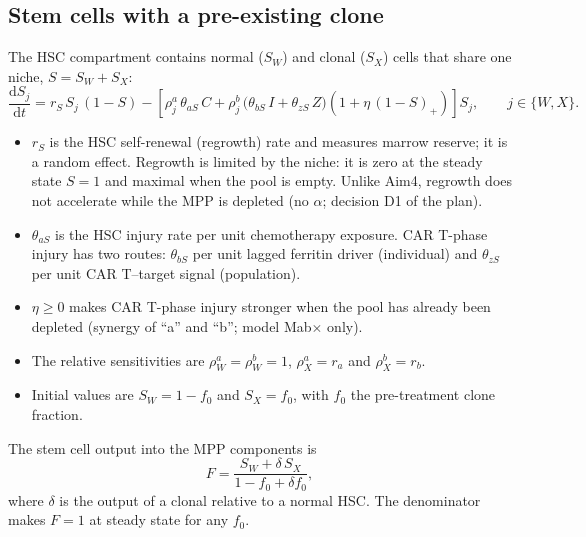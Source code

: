 \documentclass[11pt]{article}
\newcommand{\dd}{\mathrm{d}}
\newcommand{\pos}[1]{\left(#1\right)_{+}}
\begin{document}
\subsection{Stem cells with a pre-existing clone}
The HSC compartment contains normal ($S_W$) and clonal ($S_X$) cells that share one niche, $S=S_W+S_X$:
\begin{equation}
\frac{\dd S_j}{\dd t} = r_S\,S_j\,(1-S) - \left[\rho^a_j\,\theta_{aS}\,C + \rho^b_j\,\bigl(\theta_{bS}\,I+\theta_{zS}\,Z\bigr)\left(1+\eta\,\pos{1-S}\right)\right] S_j,\qquad j\in\{W,X\}.
\label{eq:hsc}
\end{equation}
\begin{itemize}
\item $r_S$ is the HSC self-renewal (regrowth) rate and measures marrow reserve; it is a random effect. Regrowth is limited by the niche: it is zero at the steady state $S=1$ and maximal when the pool is empty. Unlike Aim4, regrowth does not accelerate while the MPP is depleted (no $\alpha$; decision D1 of the plan).
\item $\theta_{aS}$ is the HSC injury rate per unit chemotherapy exposure. CAR T-phase injury has two routes: $\theta_{bS}$ per unit lagged ferritin driver (individual) and $\theta_{zS}$ per unit CAR T--target signal (population).
\item $\eta\geq0$ makes CAR T-phase injury stronger when the pool has already been depleted (synergy of ``a'' and ``b''; model Mab$\times$ only).
\item The relative sensitivities are $\rho^a_W=\rho^b_W=1$, $\rho^a_X=r_a$ and $\rho^b_X=r_b$.
\item Initial values are $S_W=1-f_0$ and $S_X=f_0$, with $f_0$ the pre-treatment clone fraction.
\end{itemize}
The stem cell output into the MPP components is
\begin{equation}
F = \frac{S_W + \delta\,S_X}{1-f_0+\delta f_0}, \label{eq:F}
\end{equation}
where $\delta$ is the output of a clonal relative to a normal HSC. The denominator makes $F=1$ at steady state for any $f_0$.
\end{document}
